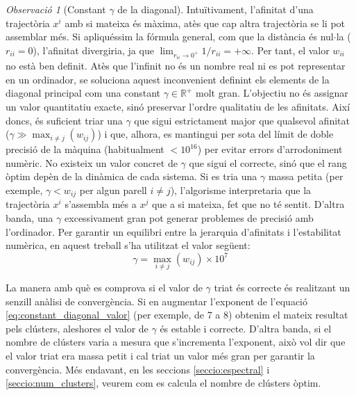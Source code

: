\documentclass[12,twoside]{TFG-GM}
\theoremstyle{definition}
\theoremstyle{remark}
\newtheorem{observation}[theorem]{Observació}
\newcommand{\R}{\mathbb{R}}
\begin{document}
\begin{observation}[Constant $\gamma$ de la diagonal]\label{obs:constant_diagonal}
Intuïtivament, l'afinitat d'una trajectòria $x^i$ amb si mateixa és màxima, atès que cap altra trajectòria se li pot assemblar més. Si apliquéssim la fórmula general, com que la distància és nul$\cdot$la ($r_{ii} = 0$), l'afinitat divergiria, ja que $\lim_{r_{ii} \to 0^+} 1/r_{ii} = +\infty$. Per tant, el valor $w_{ii}$ no està ben definit. Atès que l'infinit no és un nombre real ni es pot representar en un ordinador, se soluciona aquest inconvenient definint els elements de la diagonal principal com una constant $\gamma \in \R^+$ molt gran. L'objectiu no és assignar un valor quantitatiu exacte, sinó preservar l'ordre qualitatiu de les afinitats. Així doncs, és suficient triar una $\gamma$ que sigui estrictament major que qualsevol afinitat ($\gamma \gg \max_{i \neq j}(w_{ij})$) i que, alhora, es mantingui per sota del límit de doble precisió de la màquina (habitualment $<10^{16}$) per evitar errors d'arrodoniment numèric. No existeix un valor concret de $\gamma$ que sigui el correcte, sinó que el rang òptim depèn de la dinàmica de cada sistema. Si es tria una $\gamma$ massa petita (per exemple, $\gamma < w_{ij}$ per algun parell $i \neq j$), l'algorisme interpretaria que la trajectòria $x^i$ s'assembla més a $x^j$ que a si mateixa, fet que no té sentit. D'altra banda, una $\gamma$ excessivament gran pot generar problemes de precisió amb l'ordinador. Per garantir un equilibri entre la jerarquia d'afinitats i l'estabilitat numèrica, en aquest treball s'ha utilitzat el valor següent:
\begin{equation}\label{eq:constant_diagonal_valor}
\gamma = \max_{i \neq j}(w_{ij}) \times 10^7
\end{equation}
\end{observation}

La manera amb què es comprova si el valor de $\gamma$ triat és correcte és realitzant un senzill anàlisi de convergència. Si en augmentar l'exponent de l'equació \eqref{eq:constant_diagonal_valor} (per exemple, de 7 a 8) obtenim el mateix resultat pels clústers, aleshores el valor de $\gamma$ és estable i correcte. D'altra banda, si el nombre de clústers varia a mesura que s'incrementa l'exponent, això vol dir que el valor triat era massa petit i cal triat un valor més gran per garantir la convergència. Més endavant, en les seccions \ref{seccio:espectral} i \ref{seccio:num_clusters}, veurem com es calcula el nombre de clústers òptim.
\end{document}
